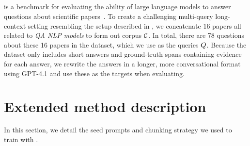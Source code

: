 \subsection{\qasper}
\qasper is a benchmark for evaluating the ability of large language models to answer questions about scientific papers~\cite{dasigi2021dataset}.
To create a challenging multi-query long-context setting resembling the setup described in , we concatenate 16 papers all related to \textit{QA NLP models} to form out corpus $\mathcal{C}$.
In total, there are 78 questions about these 16 papers in the dataset, which we use as the queries $Q$.
Because the dataset only includes short answers and ground-truth spans containing evidence for each answer, we rewrite the answers in a longer, more conversational format using GPT-4.1 and use these as the targets when evaluating.



\section{Extended method description}
\label{app:method}
\label{app:method-data}
In this section, we detail the seed prompts and chunking strategy we used to train \artifacts with \method.
